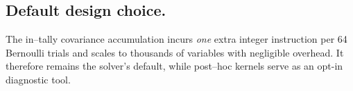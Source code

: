 \subsection{Default design choice.}  The in–tally covariance accumulation incurs
\emph{one} extra integer instruction per 64 Bernoulli trials and scales to
thousands of variables with negligible overhead.  It therefore remains the
solver’s default, while post–hoc kernels serve as an opt-in diagnostic tool.
